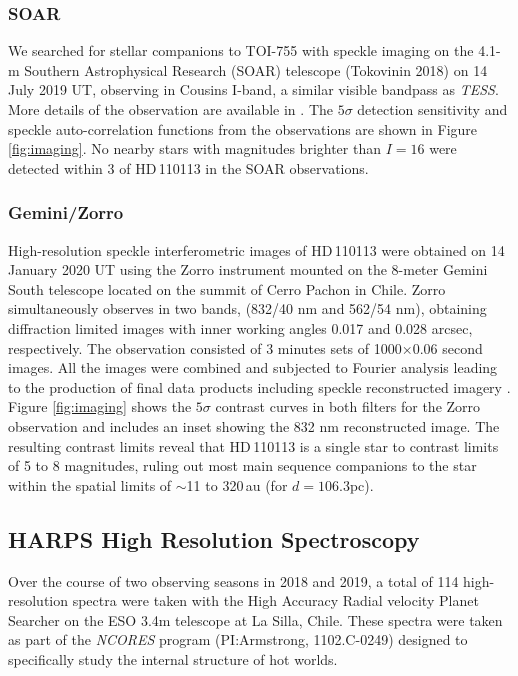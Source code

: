 \documentclass[fleqn,usenatbib]{mnras}
\newcommand{\tess}{{\it TESS}}
\newcommand{\Tstar}{HD\,110113}
\begin{document}
\subsubsection{SOAR}
We searched for stellar companions to TOI-755 with speckle imaging on the 4.1-m Southern Astrophysical Research (SOAR) telescope (Tokovinin 2018) on 14 July 2019 UT, observing in Cousins I-band, a similar visible bandpass as \tess{}. More details of the observation are available in \citet{ziegler2020vizier}. The $5\sigma$ detection sensitivity and speckle auto-correlation functions from the observations are shown in Figure \ref{fig:imaging}. No nearby stars with magnitudes brighter than $I=16$ were detected within 3\arcsec{} of \Tstar{} in the SOAR observations.

\subsubsection{Gemini/Zorro}
High-resolution speckle interferometric images of \Tstar{} were obtained on 14 January 2020 UT using the Zorro instrument mounted on the 8-meter Gemini South telescope located on the summit of Cerro Pachon in Chile. 
Zorro simultaneously observes in two bands, (832/40 nm and 562/54 nm), obtaining diffraction limited images with inner working angles 0.017 and 0.028 arcsec, respectively.
The observation consisted of 3 minutes sets of 1000×0.06 second images. All the images were combined and subjected to Fourier analysis leading to the production of final data products including speckle reconstructed imagery \citep[see][]{2011AJ....142...19H}.
Figure \ref{fig:imaging} shows the $5\sigma$ contrast curves in both filters for the Zorro observation and includes an inset showing the 832 nm reconstructed image.
The resulting contrast limits reveal that \Tstar{} is a single star to contrast limits of 5 to 8 magnitudes, ruling out most main sequence companions to the star within the spatial limits of $\sim$11 to 320\,au (for $d=106.3$pc).

\subsection{HARPS High Resolution Spectroscopy}
Over the course of two observing seasons in 2018 and 2019, a total of 114 high-resolution spectra were taken with the High Accuracy Radial velocity Planet Searcher \citep[HARPS,][]{Pepe:2002,2003Msngr.114...20M} on the ESO 3.4m telescope at La Silla, Chile.
These spectra were taken as part of the \textit{NCORES} program (PI:Armstrong, 1102.C-0249) designed to specifically study the internal structure of hot worlds.
\end{document}

